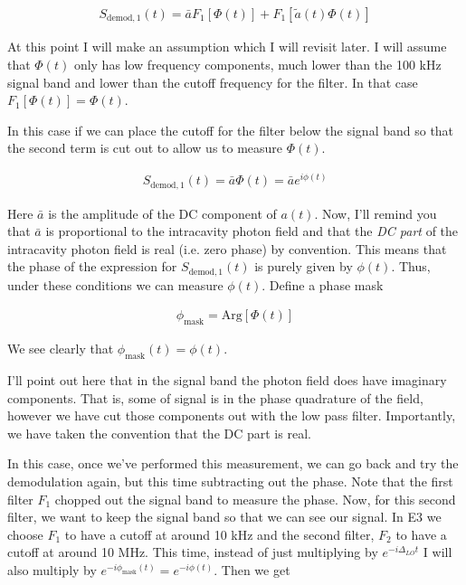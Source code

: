 \documentclass[12pt]{article}
\begin{document}
\begin{align}
S_{\text{demod},1}(t) = \bar{a}F_1\left[\Phi(t)\right] + F_1\left[\tilde{a}(t)\Phi(t) \right]
\end{align}

At this point I will make an assumption which I will revisit later. I will assume that $\Phi(t)$ only has low frequency components, much lower than the 100 kHz signal band and lower than the cutoff frequency for the filter. In that case $F_1[\Phi(t)] = \Phi(t)$. 

In this case if we can place the cutoff for the filter below the signal band so that the second term is cut out to allow us to measure $\Phi(t)$.

\begin{align}
S_{\text{demod},1}(t) = \bar{a}\Phi(t) = \bar{a}e^{i\phi(t)}
\end{align}

Here $\bar{a}$ is the amplitude of the DC component of $a(t)$.
Now, I'll remind you that $\bar{a}$ is proportional to the intracavity photon field and that the \textit{DC part} of the intracavity photon field is real (i.e. zero phase) by convention. This means that the phase of the expression for $S_{\text{demod},1}(t)$ is purely given by $\phi(t)$. Thus, under these conditions we can measure $\phi(t)$. Define a phase mask

\begin{align}
\phi_{\text{mask}} = \text{Arg}\left[\Phi(t)\right]
\end{align}

We see clearly that $\phi_{\text{mask}}(t) = \phi(t)$. 

I'll point out here that in the signal band the photon field does have imaginary components. That is, some of signal is in the phase quadrature of the field, however we have cut those components out with the low pass filter. Importantly, we have taken the convention that the DC part is real.

In this case, once we've performed this measurement, we can go back and try the demodulation again, but this time subtracting out the phase. Note that the first filter $F_1$ chopped out the signal band to measure the phase. Now, for this second filter, we want to keep the signal band so that we can see our signal. In E3 we choose $F_1$ to have a cutoff at around 10 kHz and the second filter, $F_2$ to have a cutoff at around 10 MHz. This time, instead of just multiplying by $e^{-i\Delta_{LO}t}$ I will also multiply by $e^{-i\phi_{\text{mask}}(t)}=e^{-i\phi(t)}$. Then we get
\end{document}

